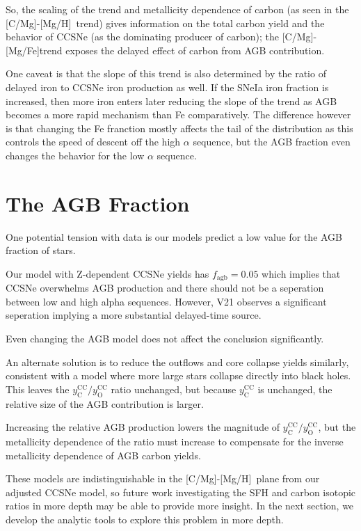 \documentclass[12pt,oneside]{book}
\newcommand{\caah}{[C/Mg]-[Mg/H]}
\newcommand{\caafe}{[C/Mg]-[Mg/Fe]}
\begin{document}
So, the scaling of the trend and metallicity dependence of carbon (as seen in
the \caah~trend) gives information on the total carbon yield and the behavior
of CCSNe (as the dominating producer of carbon);
the \caafe trend exposes the delayed effect of carbon from AGB contribution.

One caveat is that the slope of this trend is also determined by the ratio of delayed iron to CCSNe iron production as well. If the SNeIa iron fraction is increased, then more iron enters later reducing the slope of the trend as AGB becomes a more rapid mechanism than Fe comparatively. The difference however is that changing the Fe franction mostly affects the tail of the distribution as this controls the speed of descent off the high $\alpha$ sequence, but the AGB fraction even changes the behavior for the low $\alpha$ sequence.

\section{The AGB Fraction }
One potential tension with data is our models predict a low value for the AGB fraction of stars. 

Our model with Z-dependent CCSNe yields has $f_\text{agb} = 0.05$ which implies that CCSNe overwhelms AGB production and there should not be a seperation between low and high alpha sequences. However, V21 observes a significant seperation implying a more substantial delayed-time source. 

Even changing the AGB model does not affect the conclusion significantly. 

An alternate solution is to reduce the outflows and core collapse yields similarly, consistent with a model where more large stars collapse directly into black holes. This leaves the $y_\text{C}^\text{CC}/y_\text{O}^\text{CC}$ ratio unchanged, but because $y_\text{C}^\text{CC}$ is unchanged, the relative size of the AGB contribution is larger. 


Increasing the relative AGB production lowers the magnitude of  $y_\text{C}^\text{CC}/y_\text{O}^\text{CC}$, but the metallicity dependence of the ratio must increase to compensate for the inverse metallicity dependence of AGB carbon yields. 

These models are indistinguishable in the \caah~plane from our adjusted CCSNe model, so future work investigating the SFH and carbon isotopic ratios in more depth may be able to provide more insight. In the next section, we develop the analytic tools to explore this problem in more depth. 
\end{document}
